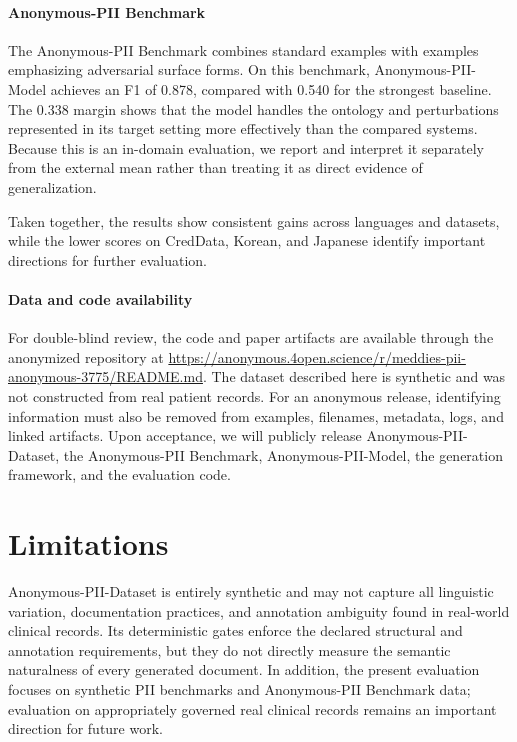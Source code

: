 \documentclass[11pt]{article}
\begin{document}
\paragraph{Anonymous-PII Benchmark} The Anonymous-PII Benchmark combines standard examples with examples emphasizing adversarial surface forms. On this benchmark, Anonymous-PII-Model achieves an F1 of 0.878, compared with 0.540 for the strongest baseline. The 0.338 margin shows that the model handles the ontology and perturbations represented in its target setting more effectively than the compared systems. Because this is an in-domain evaluation, we report and interpret it separately from the external mean rather than treating it as direct evidence of generalization.

Taken together, the results show consistent gains across languages and datasets, while the lower scores on CredData, Korean, and Japanese identify important directions for further evaluation.

\paragraph{Data and code availability} For double-blind review, the code and paper artifacts are available through the anonymized repository at \url{https://anonymous.4open.science/r/meddies-pii-anonymous-3775/README.md}. The dataset described here is synthetic and was not constructed from real patient records. For an anonymous release, identifying information must also be removed from examples, filenames, metadata, logs, and linked artifacts. Upon acceptance, we will publicly release Anonymous-PII-Dataset, the Anonymous-PII Benchmark, Anonymous-PII-Model, the generation framework, and the evaluation code.

\section{Limitations}

Anonymous-PII-Dataset is entirely synthetic and may not capture all linguistic variation, documentation practices, and annotation ambiguity found in real-world clinical records. Its deterministic gates enforce the declared structural and annotation requirements, but they do not directly measure the semantic naturalness of every generated document. In addition, the present evaluation focuses on synthetic PII benchmarks and Anonymous-PII Benchmark data; evaluation on appropriately governed real clinical records remains an important direction for future work.
\end{document}
